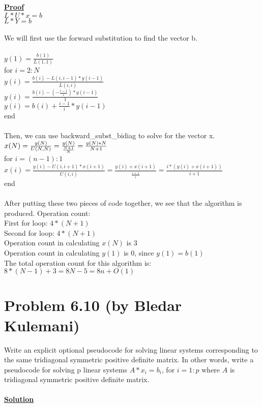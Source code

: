 \documentclass{article}
\DeclareMathOperator{\1}{\mathit{1}}
\numberwithin{figure}{section} %
\numberwithin{table}{section}
\begin{document}
\underline{\textbf {Proof}} \\
	\indent \(L*U*x=b\)\\
	\indent \(L*Y=b\)\\\\
We will first use the forward substitution to find the vector b. \\\\
\(y(1) = \frac{b(1)}{L(1,1)}\)\\
for \(i=2:N\)\\
	\indent \(y(i) = \frac{b(i)-L(i,i-1)*y(i-1)}{L(i,i)}\)\\
	\indent \(y(i) = \frac{b(i)-(-\frac{i-1}{i})*y(i-1)}{1}\)\\
	\indent \(y(i) = b(i)+\frac{i-1}{i}*y(i-1)\)\\
end\\\\
Then, we can use backward\_subst\_bidiag to solve for the vector x.\\
\indent \(x(N) = \frac{y(N)}{U(N,N)} = \frac{y(N)}{\frac{N+1}{N}}= \frac{y(N)*N}{N+1}\\\)\\
for \(i =(n-1):1\)\\
\indent \(x(i)=\frac{y(i) - U(i,i+1)*x(i+1)}{U(i,i)} = \frac{y(i) + x(i+1)}{\frac{i+1}{i}} = \frac{i*(y(i) + x(i+1))}{i+1}   \)\\
end\\\\
After putting these two pieces of code together, we see that the algorithm is produced.
Operation count:\\
	\indent First for loop: \(4*(N+1)\)\\
	\indent Second for loop: \(4*(N+1)\)\\
	\indent Operation count in calculating \(x(N)\) is 3\\
	\indent Operation count in calculating \(y(1)\) is 0, since \(y(1)=b(1)\)\\ 
The total operation count for this algorithm is: \(8*(N-1) + 3 = 8N - 5 = 8n+O(1)\)

\newpage{}
\section{Problem 6.10 (by Bledar Kulemani)}

\par Write an explicit optional pseudocode for solving linear systems corresponding to the same tridiagonal symmetric positive definite matrix. In other words, write a pseudocode for solving p linear systems \(A*x_i = b_i\), for \(i=1:p\) where \(A\) is tridiagonal symmetric positive definite matrix.\\\\
\underline{\textbf {Solution}} \\
\end{document}

